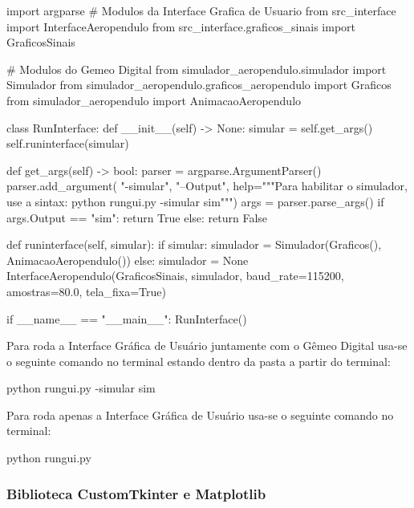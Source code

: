 \begin{python}
import argparse
# Modulos da Interface Grafica de Usuario
from src_interface import InterfaceAeropendulo
from src_interface.graficos_sinais import GraficosSinais

# Modulos do Gemeo Digital
from simulador_aeropendulo.simulador import Simulador
from simulador_aeropendulo.graficos_aeropendulo import Graficos
from simulador_aeropendulo import AnimacaoAeropendulo

class RunInterface:
    def __init__(self) -> None:
        simular = self.get_args()
        self.runinterface(simular)

    def get_args(self) -> bool:
        parser = argparse.ArgumentParser()
        parser.add_argument(
            "-simular", "--Output",
            help="""Para habilitar o simulador, use a sintax:
                    python rungui.py -simular sim""")
        args = parser.parse_args()
        if args.Output == "sim":
            return True
        else:
            return False

    def runinterface(self, simular):
        if simular:
            simulador = Simulador(Graficos(), AnimacaoAeropendulo())
        else:
            simulador = None
        InterfaceAeropendulo(GraficosSinais,
                             simulador, baud_rate=115200,
                             amostras=80.0, tela_fixa=True)

if __name__ == "__main__":
    RunInterface()


\end{python}


Para roda a Interface Gráfica de Usuário juntamente com o Gêmeo Digital usa-se o seguinte comando no terminal estando dentro da pasta a partir do terminal:

\vspace{0.5cm}

\begin{python}
python rungui.py -simular sim
\end{python}

Para roda apenas a Interface Gráfica de Usuário usa-se o seguinte comando no terminal:

\vspace{0.5cm}

\begin{python}
python rungui.py
\end{python}



\subsubsection{Biblioteca CustomTkinter e Matplotlib}

